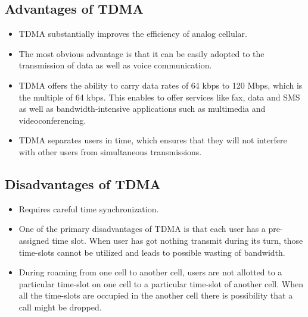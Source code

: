 \subsection{Advantages of TDMA}
\begin{itemize}
\item TDMA substantially improves the efficiency of analog cellular.
\item The most obvious advantage is that it can be easily adopted to the transmission of data as well as voice communication. 
\item TDMA offers the ability to carry data rates of 64 kbps to 120 Mbps, which is the multiple of 64 kbps. This enables to offer services like fax, data and SMS as well as bandwidth-intensive applications such as multimedia and videoconferencing. 
\item TDMA separates users in time, which ensures that they will not interfere with other users from simultaneous transmissions.
\end{itemize}
\subsection{Disadvantages of TDMA}
\begin{itemize}
\item Requires careful time synchronization.
\item One of the primary disadvantages of TDMA is that each user has a pre-assigned time slot. When user has got nothing transmit during its turn, those time-slots cannot be utilized and leads to possible wasting of bandwidth. 
\item During roaming from one cell to another cell, users are not allotted to a particular time-slot on one cell to a particular time-slot of another cell. When all the time-slots are occupied in the another cell there is possibility that a call might be dropped.
\end{itemize}
